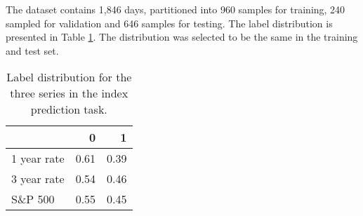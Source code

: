 The dataset contains 1,846 days, partitioned into 960 samples for training, 240 sampled for validation and 646 samples for testing. The label distribution is presented in Table \ref{tab:label_dist1}. The distribution was selected to be the same in the training and test set. 

\begin{table}[!htb]
    \centering
    \begin{tabular}{lrr}
        & \textbf{0} & \textbf{1} \\
        \hline \hline 
        1 year rate & 0.61 & 0.39 \\
        3 year rate & 0.54 & 0.46 \\
        S\&P 500 & 0.55 & 0.45 \\
        \hline 
    \end{tabular}
    \caption{Label distribution for the three series in the index prediction task. }
    \label{tab:label_dist1}
\end{table}

